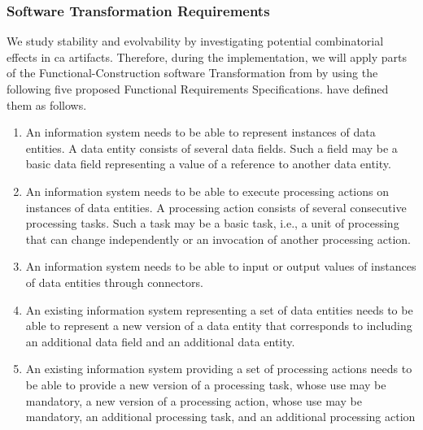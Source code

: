 \subsubsection{Software Transformation Requirements} \label{sec_requirements_transformation}

We study stability and evolvability by investigating potential combinatorial effects in
\gls{ca} artifacts. Therefore, during the implementation, we will apply parts of the
Functional-Construction software Transformation from
\textcite[251]{mannaert_normalized_2016} by using the following five proposed Functional
Requirements Specifications. \textcite[254-261]{mannaert_normalized_2016} have defined
them as follows.

\begin{enumerate}[]
    \item An information system needs to be able to represent instances of
    data entities. A data entity consists of several data fields. Such a field may be a basic
    data field representing a value of a reference to another data entity.
    
    \item An information system needs to be able to execute processing actions on
    instances of data entities. A processing action consists of several consecutive processing
    tasks. Such a task may be a basic task, i.e., a unit of processing that can change
    independently or an invocation of another processing action.
    
    \item An information system needs to be able to input or output values
    of instances of data entities through connectors.
    
    \item An existing information system representing a set of data entities needs to be
    able to represent a new version of a data entity that corresponds to including an
    additional data field and an additional data entity.
    
    \item An existing information system providing a set of processing actions needs to
    be able to provide a new version of a processing task, whose use may be mandatory, a
    new version of a processing action, whose use may be mandatory, an additional
    processing task, and an additional processing action
    
\end{enumerate}